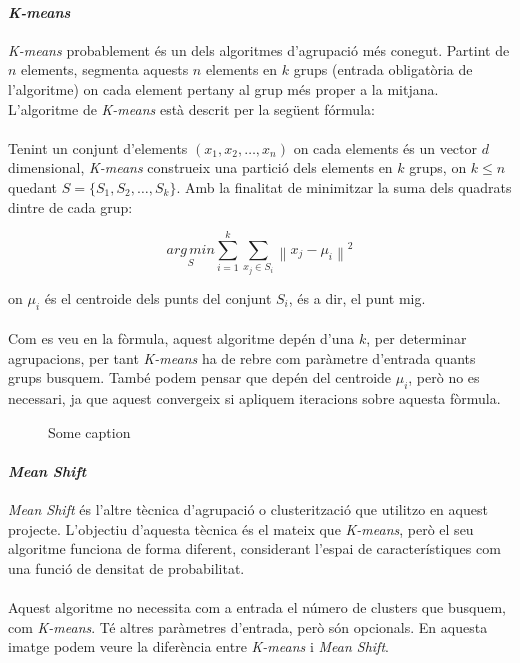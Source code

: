 \documentclass[12pt,a4paper,catalan]{article}
\begin{document}
\paragraph{\textit{K-means}}
\textit{K-means} probablement és un dels algoritmes d'agrupació més conegut. Partint de $n$ elements, segmenta aquests $n$ elements en $k$ grups (entrada obligatòria de l'algoritme) on cada element pertany al grup més proper a la mitjana. L'algoritme de \textit{K-means} està descrit per la següent fórmula:
\\
\\
Tenint un conjunt d'elements $(x_1, x_2, \ldots, x_n)$ on cada elements és un vector $d$ dimensional, \textit{K-means} construeix una partició dels elements en $k$ grups, on $k \leq n$ quedant $S = \{S_1, S_2, \ldots, S_k\}$. Amb la finalitat de minimitzar la suma dels quadrats dintre de cada grup:

$$ \underset{S} {arg\,min} \sum_{i=1}^{k} \sum_{x_j \in S_i} \left\| x_j - \mu_i \right\|^2 $$

on $\mu_i$ és el centroide dels punts del conjunt $S_i$, és a dir, el punt mig.
\\
\\
Com es veu en la fòrmula, aquest algoritme depén d'una $k$, per determinar agrupacions, per tant \textit{K-means} ha de rebre com paràmetre d'entrada quants grups busquem. També podem pensar que depén del centroide $\mu_i$, però no es necessari, ja que aquest convergeix si apliquem iteracions sobre aquesta fòrmula.

\begin{figure}[h]
\centering
{}
\caption{Some caption}
\end{figure}

\newpage

\paragraph{\textit{Mean Shift}}
\textit{Mean Shift} és l'altre tècnica d'agrupació o clusterització que utilitzo en aquest projecte. L'objectiu d'aquesta tècnica és el mateix que \textit{K-means}, però el seu algoritme funciona de forma diferent, considerant l'espai de característiques com una funció de densitat de probabilitat.
\\
\\
Aquest algoritme no necessita com a entrada el número de clusters que busquem, com \textit{K-means}. Té altres paràmetres d'entrada, però són opcionals. En aquesta imatge podem veure la diferència entre \textit{K-means} i \textit{Mean Shift}.
\end{document}
